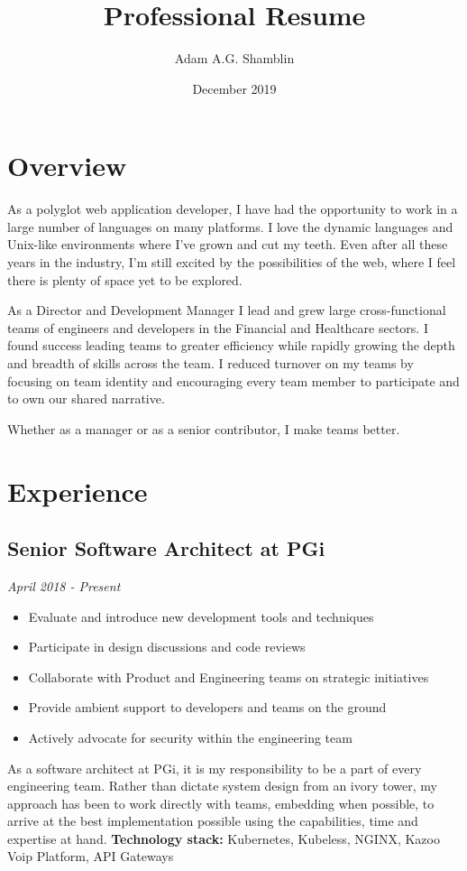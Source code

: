 \documentclass[11pt]{article}
\begin{document}
\title{Professional Resume}
\author{Adam A.G. Shamblin}
\date{December 2019}
\maketitle

\section*{Overview}
As a polyglot web application developer, I have had the opportunity to work in
a large number of languages on many platforms. I love the dynamic languages and
Unix-like environments where I've grown and cut my teeth. Even after all these
years in the industry, I'm still excited by the possibilities of the web, where
I feel there is plenty of space yet to be explored.

As a Director and Development Manager I lead and grew large cross-functional
teams of engineers and developers in the Financial and Healthcare sectors. I
found success leading teams to greater efficiency while rapidly growing the
depth and breadth of skills across the team. I reduced turnover on my teams by
focusing on team identity and encouraging every team member to participate and
to own our shared narrative.

Whether as a manager or as a senior contributor, I make teams better.

\section*{Experience}

\subsection*{Senior Software Architect at PGi}
\emph{April 2018 - Present}
\begin{itemize}
  \item Evaluate and introduce new development tools and techniques
  \item Participate in design discussions and code reviews
  \item Collaborate with Product and Engineering teams on strategic initiatives
  \item Provide ambient support to developers and teams on the ground
  \item Actively advocate for security within the engineering team
\end{itemize}
As a software architect at PGi, it is my responsibility to be a part of every
engineering team. Rather than dictate system design from an ivory tower, my
approach has been to work directly with teams, embedding when possible, to
arrive at the best implementation possible using the capabilities, time and
expertise at hand.
\textbf{Technology stack:} Kubernetes, Kubeless, NGINX, Kazoo Voip Platform, API Gateways
\end{document}

